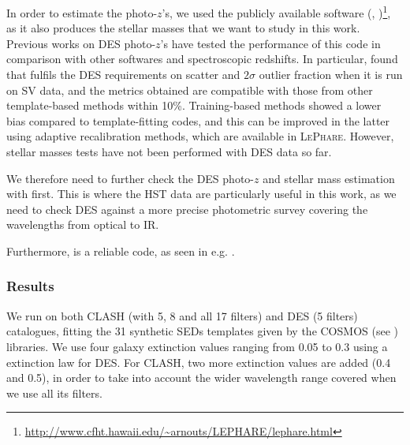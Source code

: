 {In order to estimate the photo-$z$'s, we used the publicly available software \lephare (\citealt{arnouts}, \citealt{ilbertlephare})\footnote{\url{http://www.cfht.hawaii.edu/~arnouts/LEPHARE/lephare.html}}, as it also produces the stellar masses that we want to study in this work. Previous works on DES photo-$z$'s have tested the performance of this code in comparison with other softwares and spectroscopic redshifts. In particular, \citet{sanchez} found that \lephare fulfils the DES requirements on scatter and $2\sigma$ outlier fraction when it is run on SV data, and the metrics obtained are compatible with those from other template-based methods within 10\%. Training-based methods showed a lower bias compared to template-fitting codes, and this can be improved in the latter using adaptive recalibration methods, which are available in \textsc{LePhare}. However, stellar masses tests have not been performed with DES data so far.

We therefore need to further check the DES photo-$z$ and stellar mass estimation with \lephare first. This is where the HST data are particularly useful in this work, as we need to check DES against a more precise photometric survey covering the wavelengths from optical to IR. 

Furthermore, \lephare is a reliable code, as seen in e.g. \citet{cosmos}.

\subsubsection{Results}
We run \lephare on both CLASH (with 5, 8 and all 17 filters) and DES (5 filters) catalogues, fitting the 31 synthetic SEDs templates given by the COSMOS (see \citealt{cosmos}) libraries. We use four galaxy extinction values ranging from 0.05 to 0.3 using a \citet{calzetti} extinction law for DES. For CLASH, two more extinction values are added (0.4 and 0.5), in order to take into account the wider wavelength range covered when we use all its filters. 

}
